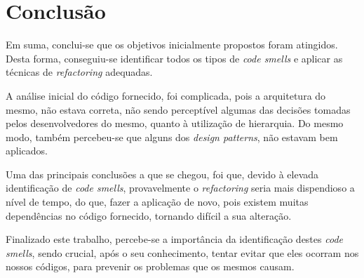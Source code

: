 \chapter{Conclusão}

\hspace{5mm} Em suma, conclui-se que os objetivos inicialmente propostos foram atingidos. Desta forma, conseguiu-se identificar todos os tipos de \textit{code smells} e aplicar as técnicas de \textit{refactoring} adequadas. 

\hspace{5mm} A análise inicial do código fornecido, foi complicada, pois a arquitetura do mesmo, não estava correta, não sendo perceptível algumas das decisões tomadas pelos desenvolvedores do mesmo, quanto à utilização de hierarquia. Do mesmo modo, também percebeu-se que alguns dos \textit{design patterns}, não estavam bem aplicados.

\hspace{5mm} Uma das principais conclusões a que se chegou, foi que, devido à elevada identificação de \textit{code smells}, provavelmente o \textit{refactoring} seria mais dispendioso a nível de tempo, do que, fazer a aplicação de novo, pois existem muitas dependências no código fornecido, tornando difícil a sua alteração.

\hspace{5mm} Finalizado este trabalho, percebe-se a importância da identificação destes \textit{code smells}, sendo crucial, após o seu conhecimento, tentar evitar que eles ocorram nos nossos códigos, para prevenir os problemas que os mesmos causam. 

